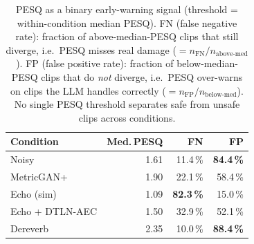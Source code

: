 \begin{table}[t]
  \centering
  \begin{tabular}{lrrr}
    \hline
    \textbf{Condition} & \textbf{Med.\,PESQ} & \textbf{FN} & \textbf{FP} \\
    \hline
    Noisy        & 1.61 & 11.4\,\% & \textbf{84.4\,\%} \\
    MetricGAN+   & 1.90 & 22.1\,\% & 58.4\,\% \\
    Echo (sim)   & 1.09 & \textbf{82.3\,\%} & 15.0\,\% \\
    Echo + DTLN-AEC & 1.50 & 32.9\,\% & 52.1\,\% \\
    Dereverb     & 2.35 & 10.0\,\% & \textbf{88.4\,\%} \\
    \hline
  \end{tabular}
  \caption{PESQ as a binary early-warning signal (threshold =
    within-condition median PESQ). FN (false negative rate):
    fraction of above-median-PESQ clips that still diverge, i.e.\
    PESQ misses real damage ($= n_{\text{FN}} / n_{\text{above-med}}$).
    FP (false positive rate): fraction of
    below-median-PESQ clips that do \emph{not} diverge, i.e.\ PESQ
    over-warns on clips the LLM handles correctly
    ($= n_{\text{FP}} / n_{\text{below-med}}$). No single PESQ
    threshold separates safe from unsafe clips across conditions.}
  \label{tab:metricfail}
\end{table}
